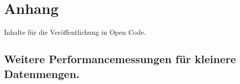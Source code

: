 \documentclass[
  german,
  10pt,
  twoside]{article}
\makeatletter
\newcommand{\berlintime}{%
  \berlinhr=\time\relax
  \divide\berlinhr by 60\relax
  \berlinmin=\time\relax
  \multiply\berlinhr by -60\relax
  \advance\berlinmin by \berlinhr\relax
  \berlinhr=\time\relax
  \divide\berlinhr by 60\relax
  \advance\berlinhr by 1\relax
  \ifnum\berlinhr>23\relax
    \advance\berlinhr by -24\relax
  \fi
  \ifnum\berlinhr<10 0\fi\the\berlinhr:\ifnum\berlinmin<10 0\fi\the\berlinmin%
}
\newif\ifdraftmode
\providecommand{\totalchars}{0}
\providecommand{\totalwords}{0}
\providecommand{\abstractchars}{0}
\providecommand{\abstractwords}{0}
\providecommand{\zusammenfassungchars}{0}
\providecommand{\zusammenfassungwords}{0}
\providecommand{\footnotecountnum}{0}
\providecommand{\citationcountnum}{0}
\newcommand{\doctitle}{$title$}
\newcommand{\docauthors}{$author-short$}
\newcommand{\docpublication}{$publication$}
\newcommand{\docpublicationissue}{$publication-issue$}
\newcommand{\metadatapage}{%
  \clearpage
  \thispagestyle{empty}
  \onecolumn
  \vspace*{1.5cm}
  
  {\raggedright
  {\LARGE\bfseries\color{wistaBlue} Dokument-Metadaten}\\[0.5cm]
  
  \begin{tabular}{@{}ll}
    \textbf{Titel:} & \doctitle \\[0.3em]
    \textbf{Autoren:} & \docauthors \\[0.3em]
    \textbf{Veröffentlichung:} & \docpublication\ \docpublicationissue \\[0.3em]
    \textbf{Erstellungsdatum:} & \today\ um \berlintime\ Uhr \\[0.3em]
  \end{tabular}
  
  \vspace{0.5cm}
  {\color{wistaBlue}\rule{\textwidth}{1pt}}
  \par}
  
  \vspace{1cm}
  
  {\large\bfseries\color{wistaDarkGray} Dokumentstatistik}\\[0.5cm]
  
  \small
  \begin{tabular}{@{}lrrrrrr@{}}
    \toprule
    \textbf{Abschnitt} & \textbf{Wörter} & \textbf{Zeichen} & \textbf{Fußn.} & \textbf{Quellen} & \textbf{Vorgabe} \\
    \midrule
    Insgesamt & \textcolor{wistaBlue}{\textbf{\totalwords}} & \textcolor{wistaBlue}{\textbf{\totalchars}} & \textcolor{wistaBlue}{\textbf{\footnotecountnum}} & \textcolor{wistaBlue}{\textbf{\citationcountnum}} & 30\,000 Z. \\
    Zusammenfassung & \textcolor{wistaBlue}{\textbf{\zusammenfassungwords}} & \textcolor{wistaBlue}{\textbf{\zusammenfassungchars}} & --- & --- & 800 Z. \\
    Abstract & \textcolor{wistaBlue}{\textbf{\abstractwords}} & \textcolor{wistaBlue}{\textbf{\abstractchars}} & --- & --- & 700 Z. \\
    \midrule
    \sectionrows
    \bottomrule
  \end{tabular}
  \normalsize
  
  \vspace{0.5cm}
  
  {\large\bfseries\color{wistaDarkGray} Schlüsselwörter}\\[0.3cm]
  \small
  \schlusselworterlist
  \normalsize
  
  \vspace{0.5cm}
  
  {\large\bfseries\color{wistaDarkGray} Keywords}\\[0.3cm]
  \small
  \keywordslist
  \normalsize
  
  \vspace{1cm}
  
  {\large\bfseries\color{wistaDarkGray} Tabellen}\\[0.3cm]
  
  \small
  \begin{tabular}{@{}lp{12cm}@{}}
    \toprule
    \textbf{Nr.} & \textbf{Beschreibung} \\
    \midrule
    \tablerows
    \bottomrule
  \end{tabular}
  \normalsize
  
  \vspace{1cm}
  
  {\large\bfseries\color{wistaDarkGray} Abbildungen}\\[0.3cm]
  
  \small
  \begin{tabular}{@{}lp{12cm}@{}}
    \toprule
    \textbf{Nr.} & \textbf{Beschreibung} \\
    \midrule
    \figurerows
    \bottomrule
  \end{tabular}
  \normalsize
  
  \clearpage
}
\makeatother
\begin{document}
\newcommand{\tablerows}{            \hyperref[tbl-pkg-versions]{Tabelle~1} & Versionen verfügbarer R-Packages \\
            \hyperref[tbl-baseline]{Tabelle~2} & Baselines in SAS und Stata (anhand 1\% des simuliertes BTP) \\
            \hyperref[tbl-benchmark-small]{Tabelle~3} & Performanz Messungen für die Fallzahlberechnung anhand 1\% des BTP \\
            \hyperref[tbl-benchmark-regr-small]{Tabelle~4} & Performanz Messungen für die Regressionsberechnung anhand 1\% des BTP \\
            \hyperref[tbl-benchmark]{Tabelle~5} & Performanz Messungen für die Fallzahlberechnung anhand 10\% des BTP \\
            \hyperref[tbl-benchmark-regr]{Tabelle~6} & Performanz Messungen für die Regressionsberechnung anhand 10\% des BTP \\
            \hyperref[tbl-bm-cnt-small]{Tabelle~7} & Benchmarkergebnisse für Fallzahlen (kleine Stichproben des BTP) \\
            \hyperref[tbl-bm-reg-small]{Tabelle~8} & Benchmarkergebnisse für Regression (kleine Stichproben des BTP) \\
}
\newcommand{\figurerows}{            \hyperref[fig-optimization-strategies]{Abbildung~1} & Strategien zur Performanz-Optimierung im FDZ-Bund \\
}
\newcommand{\schlusselworterlist}{}
\newcommand{\keywordslist}{}
\ifdraftmode
\metadatapage
\fi

\section*{Anhang}\label{anhang}

Inhalte für die Veröffentlichung in Open Code.

\subsection*{Weitere Performancemessungen für kleinere
Datenmengen.}\label{weitere-performancemessungen-fuxfcr-kleinere-datenmengen.}
\end{document}
